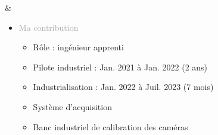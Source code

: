\documentclass{article}
\begin{document}
\begin{tabular}
    &
    \begin{itemize}[label={}, topsep=8pt, partopsep=0pt, itemsep=0.5pt, parsep=2pt, after=\vspace*{-\baselineskip}]
        \setlength{\itemsep}{10pt} 
        \item \textcolor{darkGray}{Ma contribution}
        \begin{itemize}[label={\textcolor{gray!80}{\checkmark}}, topsep=8pt, partopsep=0pt, itemsep=0.5pt, parsep=2pt] 
            \item \textcolor{gray!80}{Rôle : ingénieur apprenti}
            \item \textcolor{gray!80}{Pilote industriel : Jan. 2021 à Jan. 2022 (2 ans)}
            \item \textcolor{gray!80}{Industrialisation : Jan. 2022 à Juil. 2023 (7 mois)}
            \item \textcolor{gray!80}{Système d'acquisition}
            \item \textcolor{gray!80}{Banc industriel de calibration des caméras}
        \end{itemize}
    \end{itemize}
\end{tabular}

\begin{center}
\end{center}
\end{document}

